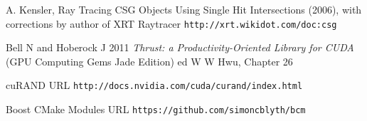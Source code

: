 \documentclass{webofc}
\begin{document}
\begin{thebibliography}{}
A. Kensler, Ray Tracing CSG Objects Using Single Hit Intersections (2006), 
with corrections by author of XRT Raytracer {\tt http://xrt.wikidot.com/doc:csg}

Bell N and Hoberock J 
2011
{\it Thrust: a Productivity-Oriented Library for CUDA}
(GPU Computing Gems Jade Edition) ed W W Hwu, Chapter 26

cuRAND URL {\tt http://docs.nvidia.com/cuda/curand/index.html}

Boost CMake Modules URL {\tt https://github.com/simoncblyth/bcm}


\end{thebibliography}
\end{document}
